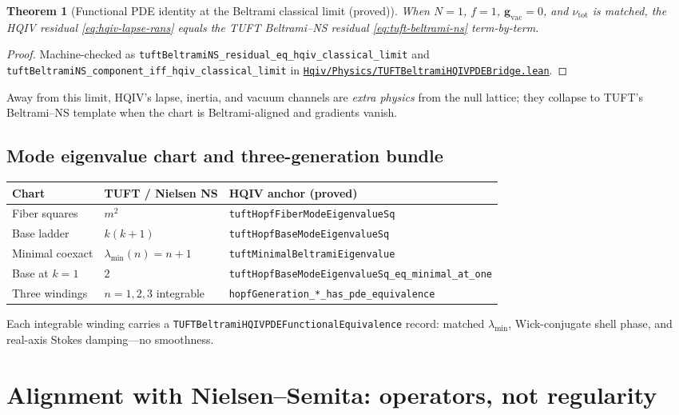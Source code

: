 \documentclass[11pt]{amsart}
\newcommand{\leanrepo}{https://github.com/HQIV/hqiv-lean/blob/main}
\newcommand{\leanfile}[1]{\href{\leanrepo/#1}{\nolinkurl{#1}}}
\newcommand{\leanid}[1]{\nolinkurl{#1}}
\newtheorem{theorem}{Theorem}[section]
\begin{document}
\begin{theorem}[Functional PDE identity at the Beltrami classical limit (proved)]
\label{thm:pde-functional}
When $N=1$, $f=1$, $\mathbf g_{\mathrm{vac}}=0$, and $\nu_{\mathrm{tot}}$ is matched, the HQIV
residual \eqref{eq:hqiv-lapse-rans} equals the TUFT Beltrami--NS residual \eqref{eq:tuft-beltrami-ns}
term-by-term.
\end{theorem}

\begin{proof}
Machine-checked as \leanid{tuftBeltramiNS_residual_eq_hqiv_classical_limit} and
\leanid{tuftBeltramiNS_component_iff_hqiv_classical_limit} in
\leanfile{Hqiv/Physics/TUFTBeltramiHQIVPDEBridge.lean}.
\end{proof}

Away from this limit, HQIV's lapse, inertia, and vacuum channels are \emph{extra physics} from the
null lattice; they collapse to TUFT's Beltrami--NS template when the chart is Beltrami-aligned and
gradients vanish.

\subsection{Mode eigenvalue chart and three-generation bundle}

\begin{center}
\small
\begin{tabular}{@{}lll@{}}
\toprule
\textbf{Chart} & \textbf{TUFT / Nielsen NS} & \textbf{HQIV anchor (proved)} \\
\midrule
Fiber squares & $m^2$ & \leanid{tuftHopfFiberModeEigenvalueSq} \\
Base ladder & $k(k+1)$ & \leanid{tuftHopfBaseModeEigenvalueSq} \\
Minimal coexact & $\lambda_{\min}(n)=n+1$ & \leanid{tuftMinimalBeltramiEigenvalue} \\
Base at $k=1$ & $2$ & \leanid{tuftHopfBaseModeEigenvalueSq_eq_minimal_at_one} \\
Three windings & $n=1,2,3$ integrable & \leanid{hopfGeneration\_*\_has_pde_equivalence} \\
\bottomrule
\end{tabular}
\end{center}

Each integrable winding carries a \leanid{TUFTBeltramiHQIVPDEFunctionalEquivalence} record:
matched $\lambda_{\min}$, Wick-conjugate shell phase, and real-axis Stokes damping---no smoothness.

\section{Alignment with Nielsen--Semita: operators, not regularity}
\label{sec:nielsen}
\end{document}
